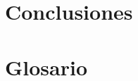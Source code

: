 \documentclass[12pt,twoside]{book}
\begin{document}
%



\chapter{Conclusiones}
    \label{capConc}



\appendix
\chapter{Glosario}





%
\end{document}
